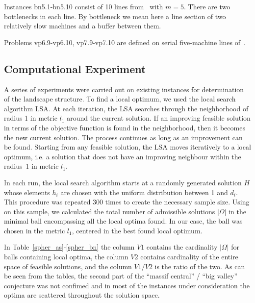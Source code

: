 \documentclass{ifacconf}
\begin{document}
Instances bn5.1-bn5.10 consist of 10 lines from~\cite{eng1} with $m=5$. There are two bottlenecks in each line. By
bottleneck we mean here a line section of two relatively slow machines and a buffer
between them. 

Problems vp6.9-vp6.10, vp7.9-vp7.10 are defined on serial five-machine lines of~\cite{vp}. 


\subsection{Computational Experiment} \label{subsec:experiment}

A series of experiments were carried out on existing instances for
determination of the landscape structure. 
To find a local optimum, we used the local search algorithm LSA. At each iteration, the LSA searches through the neighborhood of radius 1 in metric $l_1$ around
the current solution. If an improving feasible solution in terms of the  objective function is found in the neighborhood, then it becomes the new current solution.
The process continues as long as an improvement can be found.  Starting from any feasible solution, the LSA
moves iteratively to a local optimum, i.e. a solution that does not have an improving neighbour within the radius~1 in metric $l_1$.

In each run, the local search algorithm starts at a randomly generated solution $H$ whose elements $h_i$ are chosen with the
uniform distribution between 1 and $d_i$.
This procedure was repeated 300 times to create the necessary
sample size. 
Using on this sample, we calculated the total
number of admissible solutions $|\Omega |$ in the minimal ball encompassing all the
local optima found. In our case, the ball was chosen in the metric $l_1$, centered in the best found local optimum.

In Table~\ref{spher_as}-\ref{spher_bn} the column $V1$ contains the cardinality $| \Omega |$ for balls containing
local optima, the column $V2$ contains cardinality of the entire space of feasible
solutions, and the column $V1/V2$ is the ratio of the two.
As can be seen from the tables, the second part of the ``massif central'' / ``big valley'' conjecture was not 
confimed and in most of the instances under consideration
the optima are scattered throughout the solution space.
\end{document}
